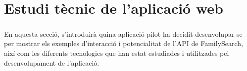 \chapter{Estudi tècnic de l'aplicació web}

    \paragraph{}
    En aquesta secció, s’introduirà quina aplicació pilot ha decidit desenvolupar-se per mostrar els exemples d’interacció i potencialitat de l’API de FamilySearch, així com les diferents tecnologies que han estat estudiades i utilitzades pel desenvolupament de l'aplicació.

    
    
    

